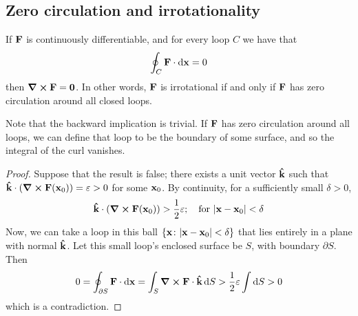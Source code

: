 \subsection{Zero circulation and irrotationality}
\begin{proposition}
	If \(\vb F\) is continuously differentiable, and for every loop \(C\) we have that
	\[
		\oint_C \vb F \cdot \dd{\vb x} = 0
	\]
	then \(\curl{\vb F} = \vb 0\).
	In other words, \(\vb F\) is irrotational if and only if \(\vb F\) has zero circulation around all closed loops.
\end{proposition}
Note that the backward implication is trivial.
If \(\vb F\) has zero circulation around all loops, we can define that loop to be the boundary of some surface, and so the integral of the curl vanishes.
\begin{proof}
	Suppose that the result is false; there exists a unit vector \(\vu{k}\) such that \(\vu{k} \cdot \left( \curl{\vb F(\vb x_0)} \right) = \varepsilon > 0\) for some \(\vb x_0\).
	By continuity, for a sufficiently small \(\delta > 0\),
	\[
		\vu{k} \cdot \left( \curl{\vb F(\vb x_0)} \right) > \frac{1}{2}\varepsilon;\quad \text{for }\abs{\vb x - \vb x_0} < \delta
	\]
	Now, we can take a loop in this ball \(\{ \vb x \colon \abs{\vb x - \vb x_0} < \delta \}\) that lies entirely in a plane with normal \(\vu{k}\).
	Let this small loop's enclosed surface be \(S\), with boundary \(\partial S\).
	Then
	\[
		0 = \oint_{\partial S} \vb F \cdot \dd{\vb x} = \int_S \curl{\vb F} \cdot \vu k \dd{S} > \frac{1}{2}\varepsilon \int \dd{S} > 0
	\]
	which is a contradiction.
\end{proof}

